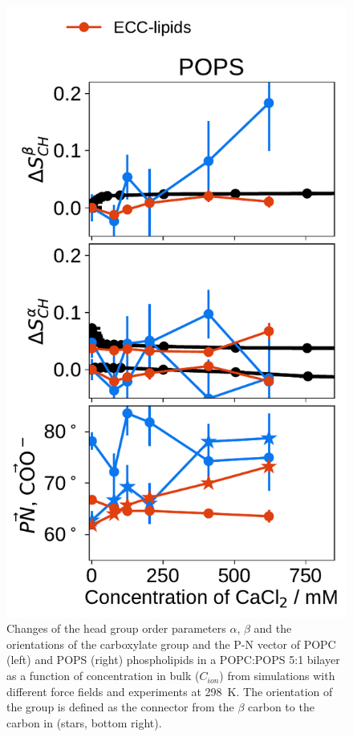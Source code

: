 \documentclass[journal=jpcbfk,manuscript=article]{achemso}
\newlength{\figheight}
\begin{document}
\begin{figure}[tbp!]
  \includegraphics[height=\figheight]{../img/ecc_pops/order_parameters_changes_ecc-lip_L14_A-B-PN-COO_POPS_cacl.pdf} 
  \caption{\label{fig:delta_ordPar_CaCl_PCPS} 
    Changes of the head group order parameters $\alpha$, $\beta$ and the orientations of the carboxylate group and the P-N vector  
    of POPC (left) and POPS (right) phospholipids in a POPC:POPS 5:1 bilayer as a function of  concentration 
    in bulk ($C_{ion}$) from simulations with different force fields and experiments at 298~K. \citep{roux90}
    The orientation of the  group is defined as 
    the connector from the $\beta$ carbon to the carbon in  (stars, bottom right).
  }
\end{figure} 
\end{document}
